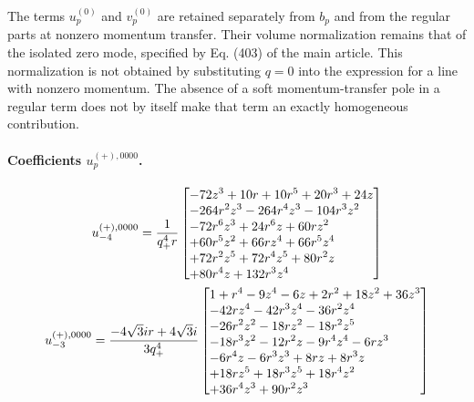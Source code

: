 \documentclass[11pt,a4paper]{article}
\begin{document}
The terms $u_p^{(0)}$ and $v_p^{(0)}$ are retained separately from $b_p$ and from the regular parts at nonzero momentum transfer. Their volume normalization remains that of the isolated zero mode, specified by Eq. (403) of the main article. This normalization is not obtained by substituting $q=0$ into the expression for a line with nonzero momentum. The absence of a soft momentum-transfer pole in a regular term does not by itself make that term an exactly homogeneous contribution.

\paragraph{Coefficients $u_p^{(+),0000}$.}
\begin{equation}
u_{-4}^{(+),0000}=\frac{1}{q_{+}^{4} r}\left[\vcenter{\hbox{\shortstack[l]{$\displaystyle  - 72 z^{3} + 10 r + 10 r^{5} + 20 r^{3} + 24 z$\\
$\displaystyle  - 264 r^{2} z^{3} - 264 r^{4} z^{3} - 104 r^{3} z^{2}$\\
$\displaystyle  - 72 r^{6} z^{3} + 24 r^{6} z + 60 r z^{2}$\\
$\displaystyle  + 60 r^{5} z^{2} + 66 r z^{4} + 66 r^{5} z^{4}$\\
$\displaystyle  + 72 r^{2} z^{5} + 72 r^{4} z^{5} + 80 r^{2} z$\\
$\displaystyle  + 80 r^{4} z + 132 r^{3} z^{4}$}}}\right]
\label{eq:cat-auxiliary-plus-0000-m4}
\end{equation}
\begin{equation}
u_{-3}^{(+),0000}=\frac{- 4 \sqrt{3} i r + 4 \sqrt{3} i}{3 q_{+}^{4}}\left[\vcenter{\hbox{\shortstack[l]{$\displaystyle 1 + r^{4} - 9 z^{4} - 6 z + 2 r^{2} + 18 z^{2} + 36 z^{3}$\\
$\displaystyle  - 42 r z^{4} - 42 r^{3} z^{4} - 36 r^{2} z^{4}$\\
$\displaystyle  - 26 r^{2} z^{2} - 18 r z^{2} - 18 r^{2} z^{5}$\\
$\displaystyle  - 18 r^{3} z^{2} - 12 r^{2} z - 9 r^{4} z^{4} - 6 r z^{3}$\\
$\displaystyle  - 6 r^{4} z - 6 r^{3} z^{3} + 8 r z + 8 r^{3} z$\\
$\displaystyle  + 18 r z^{5} + 18 r^{3} z^{5} + 18 r^{4} z^{2}$\\
$\displaystyle  + 36 r^{4} z^{3} + 90 r^{2} z^{3}$}}}\right]
\label{eq:cat-auxiliary-plus-0000-m3}
\end{equation}
\end{document}
